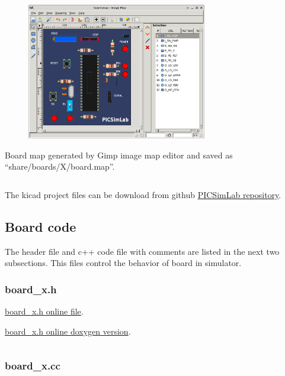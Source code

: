 \begin{figure}[H]
\center
\includegraphics[width=0.7\textwidth]{img/hb/gimp06.png} 
\end{figure} 


Board map generated by Gimp image map editor and saved as ``share/boards/X/board.map''.
\inputminted[baselinestretch=1.2,fontsize=\footnotesize,linenos]{html}{files/share/board.map}

The kicad project files can be download from github \href{https://github.com/lcgamboa/picsimlab_docs/tree/main/kicad/board_x}{PICSimLab repository}. 

\subsection{Board code}

The header file and c++ code file with comments are listed in the next two subsections. This files control the behavior of board in simulator.

\subsubsection{board\_x.h}

\href{https://github.com/lcgamboa/picsimlab/blob/master/src/boards/board_x.h}{ board\_x.h online file}.
 
\href{https://lcgamboa.github.io/picsimlab_docs/devel/html/index.html\#binc}{ board\_x.h online doxygen version}.


\inputminted[baselinestretch=1.2,fontsize=\footnotesize,linenos,bgcolor=colorbash]{c++}{files/board_x.h}

\pagebreak
\subsubsection{board\_x.cc}

